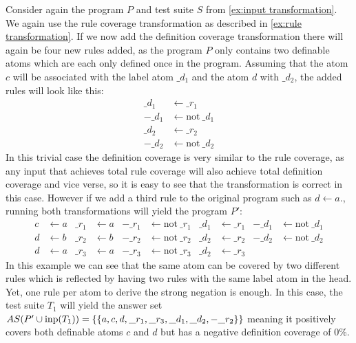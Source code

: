 \begin{example}
\label{ex:definition transformation}
    Consider again the program $P$ and test suite $S$ from \cref{ex:input transformation}. We again use the rule coverage transformation as described in \cref{ex:rule transformation}. If we now add the definition coverage transformation there will again be four new rules added, as the program $P$ only contains two definable atoms which are each only defined once in the program. Assuming that the atom $c$ will be associated with the label atom $\_d_1$ and the atom $d$ with $\_d_2$, the added rules will look like this:
    \begin{align*}
        \_d_1 &\leftarrow \_r_1 \\
        -\_d_1 &\leftarrow \text{not}\ \_d_1 \\
        \_d_2 &\leftarrow \_r_2 \\
        -\_d_2 &\leftarrow \text{not}\ \_d_2
    \end{align*}
    In this trivial case the definition coverage is very similar to the rule coverage, as any input that achieves total rule coverage will also achieve total definition coverage and vice verse, so it is easy to see that the transformation is correct in this case. However if we add a third rule to the original program such as \(d \leftarrow a.\), running both transformations will yield the program $P'$:
    \begin{align*}
        c &\leftarrow a      &  \_r_1 &\leftarrow a   & -\_r_1 &\leftarrow \text{not}\ \_r_1   &  \_d_1 &\leftarrow \_r_1     &   -\_d_1 &\leftarrow \text{not}\ \_d_1 \\
        d &\leftarrow b      &  \_r_2 &\leftarrow b   & -\_r_2 &\leftarrow \text{not}\ \_r_2   &  \_d_2 &\leftarrow \_r_2     &   -\_d_2 &\leftarrow \text{not}\ \_d_2 \\
        d &\leftarrow a      &  \_r_3 &\leftarrow a   & -\_r_3 &\leftarrow \text{not}\ \_r_3   &  \_d_2 &\leftarrow \_r_3 
    \end{align*}
    In this example we can see that the same atom can be covered by two different rules which is reflected by having two rules with the same label atom in the head. Yet, one rule per atom to derive the strong negation is enough. In this case, the test suite $T_1$ will yield the answer set \(AS(P' \cup \operatorname{inp}(T_1)) = \{\{a, c, d, \_r_1, \_r_3, \_d_1, \_d_2, -\_r_2\}\}\) meaning it positively covers both definable atoms $c$ and $d$ but has a negative definition coverage of 0\%.
\end{example}

